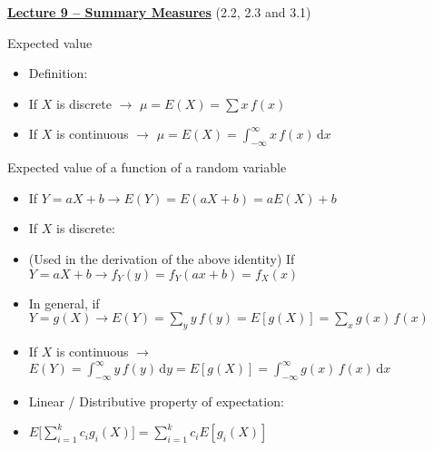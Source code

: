 \documentclass{article}
\newcommand{\bu}[1]{\textbf{\ul{#1}}}				%
\newcommand{\integral}[4]{\int_{#1}^{#2} #3 \,\mathrm{d} #4}		%
\begin{document}
%

{\large \bu{Lecture 9 -- Summary Measures}} (2.2, 2.3 and 3.1)\bigskip

Expected value
\begin{itemize}
    \item Definition:
    \item[] If $X$ is discrete $\rightarrow$ $\mu = E(X) = \displaystyle \sum x \, f(x)$
    \item[] If $X$ is continuous $\rightarrow$ $\mu = E(X) = \integral{-\infty}{\infty}{x \, f(x)}{x}$
\end{itemize}\bigskip

Expected value of a function of a random variable
\begin{itemize}
    \item If $Y = aX + b \rightarrow E(Y) = E(aX + b) = a E(X) + b$
    \item If $X$ is discrete:
    \item[] (Used in the derivation of the above identity) If $Y = aX + b \rightarrow f_Y(y) = f_Y(ax + b) = f_X(x)$ 
    \item[] In general, if $Y = g(X) \rightarrow \displaystyle E(Y) = \sum_y y \, f(y) = E[g(X)] = \sum_x g(x) \, f(x)$
    \item If $X$ is continuous $\rightarrow$ $E(Y) = \integral{-\infty}{\infty}{y \, f(y)}{y} = E[g(X)] = \integral{-\infty}{\infty}{g(x) \, f(x)}{x}$
    \item Linear / Distributive property of expectation:
    \item[] $\displaystyle E\bigg[\sum_{i = 1}^k c_i g_i(X)\bigg] = \sum_{i = 1}^k c_i E[g_i(X)]$
\end{itemize}\bigskip
\end{document}
